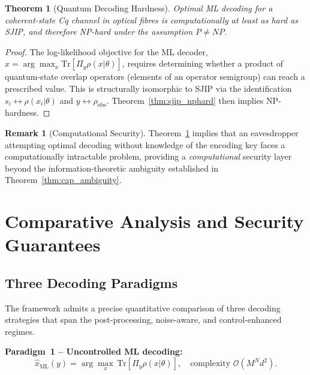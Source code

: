 \documentclass[journal,twocolumn]{IEEEtran}
\theoremstyle{definition}
\newtheorem{remark}[definition]{Remark}
\theoremstyle{plain}
\newtheorem{theorem}{Theorem}[section]
\newcommand{\Tr}{\mathrm{Tr}}
\begin{document}
\begin{theorem}[Quantum Decoding Hardness]
\label{thm:decoding_hard}
Optimal ML decoding for a coherent-state Cq channel in optical
fibres is computationally at least as hard as SJIP, and therefore
NP-hard under the assumption $P \ne NP$.
\end{theorem}

\begin{proof}
The log-likelihood objective for the ML decoder,
$\hat x = \arg\max_x \Tr[\Pi_y \rho(x|\theta)]$, requires
determining whether a product of quantum-state overlap operators
(elements of an operator semigroup) can reach a prescribed value.
This is structurally isomorphic to SJIP via the identification
$s_i \leftrightarrow \rho(x_i|\theta)$ and
$y \leftrightarrow \rho_{\mathrm{obs}}$.  Theorem~\ref{thm:sjip_nphard}
then implies NP-hardness.
\end{proof}

\begin{remark}[Computational Security]
Theorem~\ref{thm:decoding_hard} implies that an eavesdropper
attempting optimal decoding without knowledge of the encoding key
faces a computationally intractable problem, providing a
\emph{computational} security layer beyond the information-theoretic
ambiguity established in Theorem~\ref{thm:cap_ambiguity}.
\end{remark}

\section{Comparative Analysis and Security Guarantees}
\label{sec:security}

\subsection{Three Decoding Paradigms}

The framework admits a precise quantitative comparison of three
decoding strategies that span the post-processing, noise-aware,
and control-enhanced regimes.

\medskip\noindent\textbf{Paradigm~1 -- Uncontrolled ML decoding:}
\begin{equation}
  \hat x_{\mathrm{ML}}(y) = \arg\max_x\, \Tr[\Pi_y \rho(x|\theta)],
  \quad \text{complexity } \mathcal{O}(M^N d^2).
  \label{eq:paradigm1}
\end{equation}
\end{document}

